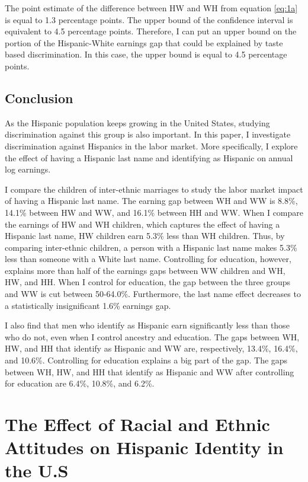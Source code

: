 \documentclass[12pt, fullpage]{article}
\begin{document}
The point estimate of the difference between HW and WH from equation \ref{eq:1a} is equal to 1.3 percentage points. The upper bound of the confidence interval is equivalent to 4.5 percentage points. Therefore, I can put an upper bound on the portion of the Hispanic-White earnings gap that could be explained by taste based discrimination. In this case, the upper bound is equal to 4.5 percentage points.

\subsection{Conclusion}\label{sec:con}

As the Hispanic population keeps growing in the United States, studying discrimination against this group is also important. In this paper, I investigate discrimination against Hispanics in the labor market. More specifically, I explore the effect of having a Hispanic last name and identifying as Hispanic on annual log earnings. 

I compare the children of inter-ethnic marriages to study the labor market impact of having a Hispanic last name. The earning gap between WH and WW is 8.8\%, 14.1\% between HW and WW, and 16.1\% between HH and WW. When I compare the earnings of HW and WH children, which captures the effect of having a Hispanic last name, HW children earn 5.3\% less than WH children. Thus, by comparing inter-ethnic children, a person with a Hispanic last name makes 5.3\% less than someone with a White last name. Controlling for education, however, explains more than half of the earnings gaps between WW children and WH, HW, and HH. When I control for education, the gap between the three groups and WW is cut between 50-64.0\%. Furthermore, the last name effect decreases to a statistically insignificant 1.6\% earnings gap.

I also find that men who identify as Hispanic earn significantly less than those who do not, even when I control ancestry and education. The gaps between WH, HW, and HH that identify as Hispanic and WW are, respectively, 13.4\%, 16.4\%, and 10.6\%. Controlling for education explains a big part of the gap. The gaps between WH, HW, and HH that identify as Hispanic and WW after controlling for education are 6.4\%, 10.8\%, and 6.2\%. 

\pagebreak
\newpage

\section[\bf \uppercase{The Effect of Racial and Ethnic Attitudes on Hispanic Identity in the U.S}]{The Effect of Racial and Ethnic Attitudes on Hispanic Identity in the U.S}
\end{document}
